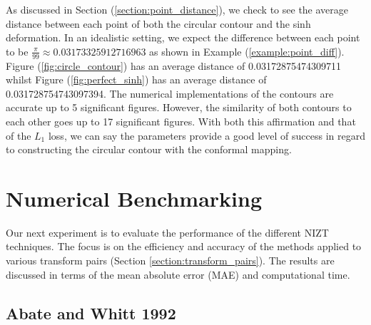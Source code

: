 \documentclass[a4paper]{report}
\begin{document}
As discussed in Section (\ref{section:point_distance}), we check to see the average distance between each point of both the circular contour and the sinh deformation. In an idealistic setting, we expect the difference between each point to be $\frac{\pi}{99} \approx 0.03173325912716963$ as shown in Example (\ref{example:point_diff}). Figure (\ref{fig:circle_contour}) has an average distance of 0.03172875474309711  whilst Figure (\ref{fig:perfect_sinh}) has an average distance of 0.031728754743097394. The numerical implementations of the contours are accurate up to 5 significant figures. However, the similarity of both contours to each other goes up to 17 significant figures. With both this affirmation and that of the $L_1$ loss, we can say the parameters provide a good level of success in regard to constructing the circular contour with the conformal mapping.

\section{Numerical Benchmarking}
Our next experiment is to evaluate the performance of the different NIZT techniques. The focus is on the efficiency and accuracy of the methods applied to various transform pairs (Section \ref{section:transform_pairs}). The results are discussed in terms of the mean absolute error (MAE) and computational time.

\subsection{Abate and Whitt 1992}
\end{document}
